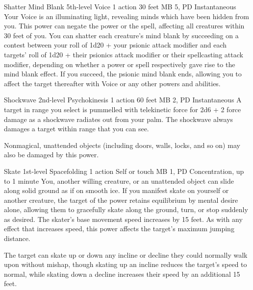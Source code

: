 \DndPowerHeader%
  {Shatter Mind Blank}
  {5th-level Voice}
  {1 action}
  {30 feet}
  {MB 5, PD \lvlfive}
  {Instantaneous}
Your Voice is an illuminating light,
revealing minds which have been hidden from you.
This power can negate the  power
or the  spell,
affecting all creatures within 30 feet of you.
You can shatter each creature's mind blank by succeeding on a
contest between your roll of
1d20 + your psionic attack modifier
and each targets' roll of 
1d20 + their psionics attack modifier or
their spellcasting attack modifier,
depending on whether a power or spell respectively
gave rise to the mind blank effect.
If you succeed,
the psionic mind blank ends,
allowing you to affect the target thereafter
with Voice or any other powers and abilities.

\DndPowerHeader%
  {Shockwave}
  {2nd-level Psychokinesis}
  {1 action}
  {60 feet}
  {MB 2, PD \lvltwo}
  {Instantaneous}
A target in range you select is pummelled with telekinetic force
for 2d6 + 2 force damage as a shockwave radiates out from your palm.
The shockwave always damages a target within range that you can see.

Nonmagical, unattended objects
(including doors, walls, locks, and so on)
may also be damaged by this power.

\DndPowerHeader%
  {Skate}
  {1st-level Spacefolding}
  {1 action}
  {Self or touch}
  {MB 1, PD \lvlone}
  {Concentration, up to 1 minute}
You, another willing creature, or an unattended object
can slide along solid ground as if on smooth ice.
If you manifest skate on yourself or another creature,
the target of the power retains equilibrium by mental desire alone,
allowing them to gracefully skate along the ground,
turn, or stop suddenly as desired.
The skater's base movement speed increases by 15 feet.
As with any effect that increases speed,
this power affects the target's maximum jumping distance.

The target can skate up or down any incline or decline
they could normally walk upon without mishap,
though skating up an incline reduces the target's speed to normal,
while skating down a decline increases their speed
by an additional 15 feet.

